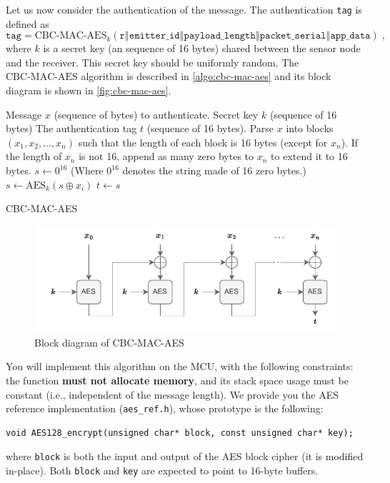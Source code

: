 Let us now consider the authentication of the message. The authentication
\texttt{tag} is defined as
\[
    \texttt{tag} = \text{CBC-MAC-AES}_{k}\left(
        \texttt{r$\mathbin\Vert$emitter\_id$\mathbin\Vert$payload\_length$\mathbin\Vert$packet\_serial$\mathbin\Vert$app\_data}
    \right)\;,
\]
where $k$ is a secret key (an sequence of 16 bytes) shared between the sensor
node and the receiver. This secret key should be uniformly random. The $\text{CBC-MAC-AES}$ algorithm is described in \autoref{algo:cbc-mac-aes} and its block diagram is shown in \autoref{fig:cbc-mac-aes}.
\begin{algorithm}
\begin{algorithmic}
    \REQUIRE Message $x$ (sequence of bytes) to authenticate.
    \REQUIRE Secret key $k$ (sequence of 16 bytes)
    \ENSURE The authentication tag $t$ (sequence of 16 bytes).
    \STATE Parse $x$ into blocks $\left(x_1,x_2,\dots,x_n\right)$ such that the
    length of each block is 16 bytes (except for $x_n$).
    \STATE If the length of $x_n$ is not 16, append as many zero bytes to $x_n$
    to extend it to 16 bytes.
    \STATE $s \leftarrow 0^{16}$ (Where $0^{16}$ denotes the string made of 16 zero bytes.)
    \STATE $s \leftarrow \text{AES}_k(s \oplus x_i)$
    \ENDFOR
    \STATE $t \leftarrow s$
\end{algorithmic}
\caption{CBC-MAC-AES}
\label{algo:cbc-mac-aes}
\end{algorithm}

\begin{figure}[h]
\centering
\includegraphics[scale=1]{figures/crypto_cbc_mac_aes.pdf}
\caption{Block diagram of CBC-MAC-AES}
\label{fig:cbc-mac-aes}
\end{figure}

You will implement this algorithm on the MCU, with the following constraints:
the function \textbf{must not allocate memory}, and its stack space usage must be
constant (i.e., independent of the message length).
We provide you the AES reference implementation (\texttt{aes\_ref.h}), whose
prototype is the following:
\begin{lstlisting}[style=customc]
void AES128_encrypt(unsigned char* block, const unsigned char* key);
\end{lstlisting}
where \texttt{block} is both the input and output of the AES block cipher (it
is modified in-place).
Both \texttt{block} and \texttt{key} are expected to point to 16-byte buffers.


